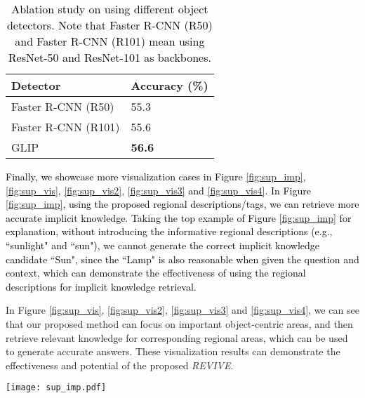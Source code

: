 \documentclass{article}
\begin{document}
\begin{table}[!]
    \begin{minipage}{\linewidth}
      \caption{\textcolor{black}{Ablation study on using different object detectors. Note that Faster R-CNN (R50) and Faster R-CNN (R101) mean using ResNet-50 \cite{he2016deep} and ResNet-101 \cite{he2016deep} as backbones.}}
      \centering
          \label{detector}
        \begin{tabular}{p{4.7cm}<{\centering} p{3.2cm}<{\centering}}
            \toprule
            Detector & Accuracy (\%) \\
            \midrule
            Faster R-CNN (R50) & 55.3  \\
            Faster R-CNN (R101) & 55.6  \\
            GLIP &  \textbf{56.6} \\
            \bottomrule
        \end{tabular}
    \end{minipage}\end{table}

\textcolor{black}{Finally, we showcase more visualization cases in Figure \ref{fig:sup_imp}, \ref{fig:sup_vis}, \ref{fig:sup_vis2}, \ref{fig:sup_vis3} and \ref{fig:sup_vis4}. In Figure \ref{fig:sup_imp}, using the proposed regional descriptions/tags, we can retrieve more accurate implicit knowledge. Taking the top example of Figure \ref{fig:sup_imp} for explanation, without introducing the informative regional descriptions (e.g., ``sunlight" and ``sun"), we cannot generate the correct implicit knowledge candidate ``Sun", since the ``Lamp" is also reasonable when given the question and context, which can demonstrate the effectiveness of using the regional descriptions for implicit knowledge retrieval.}

In Figure \ref{fig:sup_vis}, \ref{fig:sup_vis2}, \ref{fig:sup_vis3} and \ref{fig:sup_vis4}, we can see that our proposed method can focus on important object-centric areas, and then retrieve relevant knowledge for corresponding regional areas, which can be used to generate accurate answers. These visualization results can demonstrate the effectiveness and potential of the proposed \textit{REVIVE}.


\begin{figure*}[!]
\begin{center}
\texttt{[image: sup\_imp.pdf]}
\end{center}
    \vspace{-2mm}
   \caption{The implicit knowledge retrieval visualization results without and with the proposed regional descriptions/tags. Note that \textit{``Imp."} and \textit{``R-Imp."} mean the implicit knowledge retrieved without and with the regional descriptions/tags. ``Regional Tags" represents the proposed regional descriptions. ``Context" means the caption. We only use 10 regional tags for illustration.}
\label{fig:sup_imp}
\end{figure*}
\end{document}
